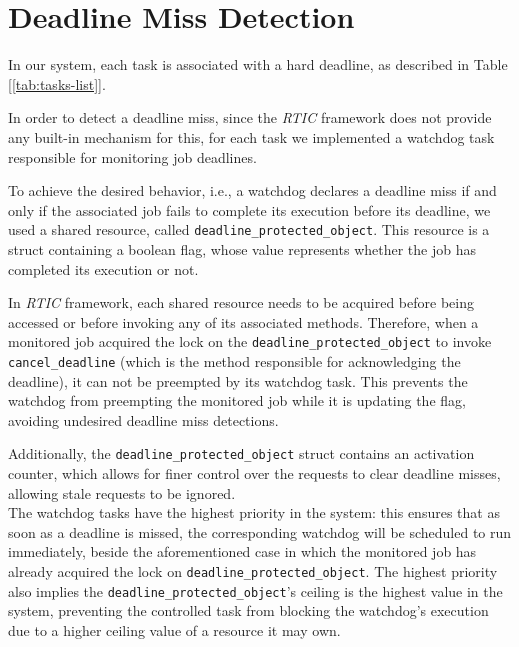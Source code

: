 \section{Deadline Miss Detection}
\label{sec:DeadlineMissDetection}
In our system, each task is associated with a hard deadline, as described in
Table [\ref{tab:tasks-list}].

In order to detect a deadline miss, since the 
\textit{RTIC} framework does not provide any built-in mechanism for this, for
each task we implemented a watchdog task responsible for monitoring job
deadlines. 

To achieve the desired behavior, i.e., a watchdog declares a deadline miss if
and only if the associated job fails to complete its execution before its
deadline, we used a shared resource, called
\texttt{deadline\_protected\_object}. This resource is a struct containing a
boolean flag, whose value represents whether the job has completed its
execution or not.

In \textit{RTIC} framework, each shared resource needs
to be acquired before being accessed or before invoking any of its associated
methods. Therefore, when a monitored job acquired the lock on the
\texttt{deadline\_protected\_object} to invoke \texttt{cancel\_deadline} (which
is the method responsible for acknowledging the deadline), it can not be
preempted by its watchdog task. This prevents the watchdog from preempting the
monitored job while it is updating the flag, avoiding undesired deadline miss
detections.

Additionally, the \texttt{deadline\_protected\_object} struct contains an
activation counter, which allows for finer control over the requests to clear
deadline misses, allowing stale requests to be ignored. \\
The watchdog tasks have the highest priority in the system: this ensures that as
soon as a deadline is missed, the corresponding watchdog will be scheduled to
run immediately, beside the aforementioned case in which the monitored job has
already acquired the lock on \texttt{deadline\_protected\_object}. The
highest priority also implies the \texttt{deadline\_protected\_object}’s ceiling
is the highest value in the system, preventing the controlled task from blocking
the watchdog’s execution due to a higher ceiling value of a resource it may own.\\ 

